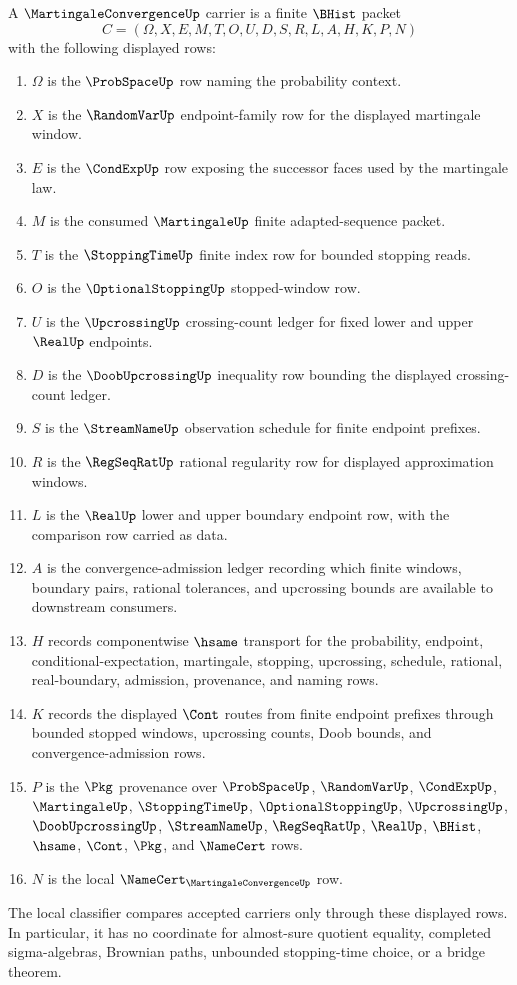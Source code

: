 \begin{definition}
\label{def:martingale-convergence-carrier}
A $\MartingaleConvergenceUp$ carrier is a finite $\BHist$ packet
$$
C=(\Omega,X,E,M,T,O,U,D,S,R,L,A,H,K,P,N)
$$
with the following displayed rows:
\begin{enumerate}
\item $\Omega$ is the $\ProbSpaceUp$ row naming the probability context.
\item $X$ is the $\RandomVarUp$ endpoint-family row for the displayed martingale window.
\item $E$ is the $\CondExpUp$ row exposing the successor faces used by the martingale law.
\item $M$ is the consumed $\MartingaleUp$ finite adapted-sequence packet.
\item $T$ is the $\StoppingTimeUp$ finite index row for bounded stopping reads.
\item $O$ is the $\OptionalStoppingUp$ stopped-window row.
\item $U$ is the $\UpcrossingUp$ crossing-count ledger for fixed lower and upper $\RealUp$ endpoints.
\item $D$ is the $\DoobUpcrossingUp$ inequality row bounding the displayed crossing-count ledger.
\item $S$ is the $\StreamNameUp$ observation schedule for finite endpoint prefixes.
\item $R$ is the $\RegSeqRatUp$ rational regularity row for displayed approximation windows.
\item $L$ is the $\RealUp$ lower and upper boundary endpoint row, with the comparison row carried as data.
\item $A$ is the convergence-admission ledger recording which finite windows, boundary pairs, rational tolerances, and upcrossing bounds are available to downstream consumers.
\item $H$ records componentwise $\hsame$ transport for the probability, endpoint, conditional-expectation, martingale, stopping, upcrossing, schedule, rational, real-boundary, admission, provenance, and naming rows.
\item $K$ records the displayed $\Cont$ routes from finite endpoint prefixes through bounded stopped windows, upcrossing counts, Doob bounds, and convergence-admission rows.
\item $P$ is the $\Pkg$ provenance over $\ProbSpaceUp$, $\RandomVarUp$, $\CondExpUp$, $\MartingaleUp$, $\StoppingTimeUp$, $\OptionalStoppingUp$, $\UpcrossingUp$, $\DoobUpcrossingUp$, $\StreamNameUp$, $\RegSeqRatUp$, $\RealUp$, $\BHist$, $\hsame$, $\Cont$, $\Pkg$, and $\NameCert$ rows.
\item $N$ is the local $\NameCert_{\MartingaleConvergenceUp}$ row.
\end{enumerate}
The local classifier compares accepted carriers only through these displayed rows. In particular, it has no coordinate for almost-sure quotient equality, completed sigma-algebras, Brownian paths, unbounded stopping-time choice, or a bridge theorem.
\end{definition}

